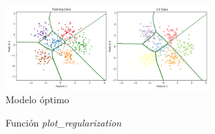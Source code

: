 \documentclass[6pt]{../../shared/AiTex}
\begin{document}
\begin{figure}[H]
    \centering
    \includegraphics[width=0.7\textwidth]{./images/decision_boundary_regularized_optimal.png}
    \caption{Modelo óptimo}
    \label{fig:optim_res}
\end{figure}

\begin{figure}[H]
    \centering
    
    \caption{Función \textit{plot\_regularization}}
    \label{fig:plot_regularization}
\end{figure}
\end{document}
